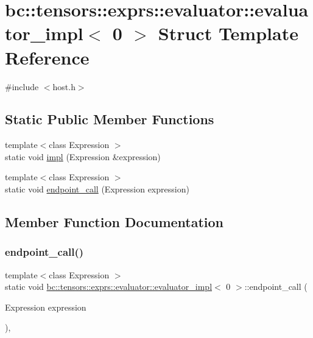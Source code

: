 \hypertarget{structbc_1_1tensors_1_1exprs_1_1evaluator_1_1evaluator__impl_3_010_01_4}{}\section{bc\+:\+:tensors\+:\+:exprs\+:\+:evaluator\+:\+:evaluator\+\_\+impl$<$ 0 $>$ Struct Template Reference}
\label{structbc_1_1tensors_1_1exprs_1_1evaluator_1_1evaluator__impl_3_010_01_4}


{\ttfamily \#include $<$host.\+h$>$}

\subsection*{Static Public Member Functions}
\begin{DoxyCompactItemize}
\item 
{\footnotesize template$<$class Expression $>$ }\\static void \hyperlink{structbc_1_1tensors_1_1exprs_1_1evaluator_1_1evaluator__impl_3_010_01_4_a95d9a136f6a1861e0c17170f159cffb6}{impl} (Expression \&expression)
\item 
{\footnotesize template$<$class Expression $>$ }\\static void \hyperlink{structbc_1_1tensors_1_1exprs_1_1evaluator_1_1evaluator__impl_3_010_01_4_ac7bb644179e44383998cda7f07341191}{endpoint\+\_\+call} (Expression expression)
\end{DoxyCompactItemize}


\subsection{Member Function Documentation}
\mbox{\label{structbc_1_1tensors_1_1exprs_1_1evaluator_1_1evaluator__impl_3_010_01_4_ac7bb644179e44383998cda7f07341191}} 
\subsubsection{\texorpdfstring{endpoint\+\_\+call()}{endpoint\_call()}}
{\footnotesize\ttfamily template$<$class Expression $>$ \\
static void \hyperlink{structbc_1_1tensors_1_1exprs_1_1evaluator_1_1evaluator__impl}{bc\+::tensors\+::exprs\+::evaluator\+::evaluator\+\_\+impl}$<$ 0 $>$\+::endpoint\+\_\+call (\begin{DoxyParamCaption}\item[{Expression}]{expression }\end{DoxyParamCaption})\hspace{0.3cm}{\ttfamily [inline]}, {\ttfamily [static]}}

